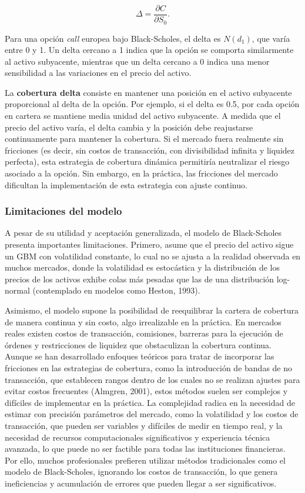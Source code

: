 \documentclass[11pt,a4paper,spanish]{article}
\numberwithin{equation}{section} %
\begin{document}
\begin{equation}
\Delta = \frac{\partial C}{\partial S_0}.
\end{equation}

Para una opción \textit{call} europea bajo Black-Scholes, el delta es $N(d_1)$, que varía entre 0 y 1. Un delta cercano a 1 indica que la opción se comporta similarmente al activo subyacente, mientras que un delta cercano a 0 indica una menor sensibilidad a las variaciones en el precio del activo.

La \textbf{cobertura delta} consiste en mantener una posición en el activo subyacente proporcional al delta de la opción. Por ejemplo, si el delta es 0.5, por cada opción en cartera se mantiene media unidad del activo subyacente. A medida que el precio del activo varía, el delta cambia y la posición debe reajustarse continuamente para mantener la cobertura. Si el mercado fuera realmente sin fricciones (es decir, sin costos de transacción, con divisibilidad infinita y liquidez perfecta), esta estrategia de cobertura dinámica permitiría neutralizar el riesgo asociado a la opción. Sin embargo, en la práctica, las fricciones del mercado dificultan la implementación de esta estrategia con ajuste continuo.

\subsubsection{Limitaciones del modelo}

A pesar de su utilidad y aceptación generalizada, el modelo de Black-Scholes presenta importantes limitaciones. Primero, asume que el precio del activo sigue un GBM con volatilidad constante, lo cual no se ajusta a la realidad observada en muchos mercados, donde la volatilidad es estocástica y la distribución de los precios de los activos exhibe colas más pesadas que las de una distribución log-normal (contemplado en modelos como Heston, 1993).

Asimismo, el modelo supone la posibilidad de reequilibrar la cartera de cobertura de manera continua y sin costo, algo irrealizable en la práctica. En mercados reales existen costos de transacción, comisiones, barreras para la ejecución de órdenes y restricciones de liquidez que obstaculizan la cobertura continua. Aunque se han desarrollado enfoques teóricos para tratar de incorporar las fricciones en las estrategias de cobertura, como la introducción de bandas de no transacción, que establecen rangos dentro de los cuales no se realizan ajustes para evitar costos frecuentes (Almgren, 2001), estos métodos suelen ser complejos y difíciles de implementar en la práctica. La complejidad radica en la necesidad de estimar con precisión parámetros del mercado, como la volatilidad y los costos de transacción, que pueden ser variables y difíciles de medir en tiempo real, y la necesidad de recursos computacionales significativos y experiencia técnica avanzada, lo que puede no ser factible para todas las instituciones financieras. Por ello, muchos profesionales prefieren utilizar métodos tradicionales como el modelo de Black-Scholes, ignorando los costos de transacción, lo que genera ineficiencias y acumulación de errores que pueden llegar a ser significativos.
\end{document}
